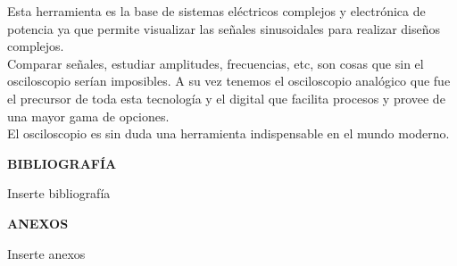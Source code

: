 \documentclass[12pt]{article}
\begin{document}
\begin{enumerate}
		\noindent Esta herramienta es la base de sistemas eléctricos complejos y electrónica de potencia ya que permite visualizar las señales sinusoidales para realizar diseños complejos.\\
		
		\noindent Comparar señales, estudiar amplitudes, frecuencias, etc, son cosas que sin el osciloscopio serían imposibles. A su vez tenemos el osciloscopio analógico que fue el precursor de toda esta tecnología y el digital que facilita procesos y provee de una mayor gama de opciones.\\
		
		\noindent El osciloscopio es sin duda una herramienta indispensable en el mundo moderno.
		
	\end{enumerate}
	
	\newpage
	
	\begin{center}
		\textbf{\large BIBLIOGRAFÍA}\\
	\end{center}
	
	Inserte bibliografía
	
	\newpage
	
	\begin{center}
		\textbf{\large ANEXOS}\\
	\end{center}
	
	Inserte anexos
	
\end{document}
